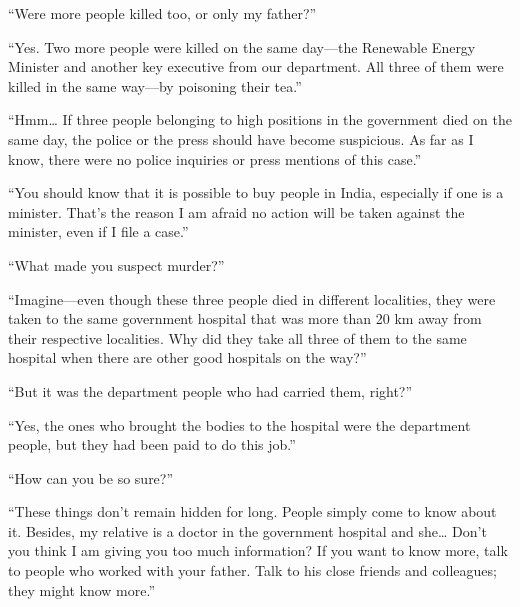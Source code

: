 “Were more people killed too, or only my father?”

“Yes. Two more people were killed on the same day—the Renewable Energy
Minister and another key executive from our department. All three of them were
killed in the same way—by poisoning their tea.”

“Hmm… If three people belonging to high positions in the government died on the same
day, the police or the press should have become suspicious. As far as I know,
there were no police inquiries or press mentions of this case.”

“You should know that it is possible to buy people in India, especially if one
is a minister. That's the reason I am afraid no action will be taken against the
minister, even if I file a case.”

“What made you suspect murder?”

“Imagine—even though these three people died in different localities, they
were taken to the same government hospital that was more than 20 km away from
their respective localities. Why did they take all three of them to the same
hospital when there are other good hospitals on the way?”

“But it was the department people who had carried them, right?”

“Yes, the ones who brought the bodies to the hospital were the department
people, but they had been paid to do this job.”

“How can you be so sure?”

“These things don't remain hidden for long. People simply come to know about it.
Besides, my relative is a doctor in the government hospital and she… Don't
you think I am giving you too much information? If you want to know more, talk
to people who worked with your father. Talk to his close friends and colleagues; they might know more.”